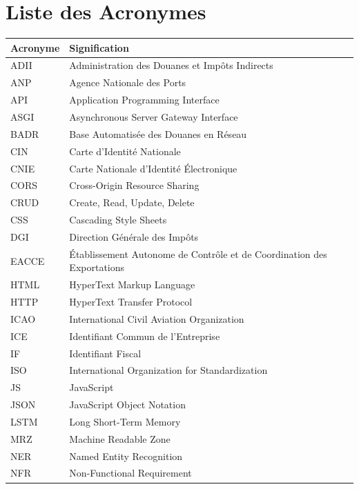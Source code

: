 
\chapter*{Liste des Acronymes}

\renewcommand{\arraystretch}{1.2}

\begin{longtable}{p{3cm} p{11cm}}
\toprule
\textbf{Acronyme} & \textbf{Signification} \\
\midrule
\endhead

ADII   & Administration des Douanes et Imp\^{o}ts Indirects \\
ANP    & Agence Nationale des Ports \\
API    & Application Programming Interface \\
ASGI   & Asynchronous Server Gateway Interface \\
BADR   & Base Automatis\'{e}e des Douanes en R\'{e}seau \\
CIN    & Carte d'Identit\'{e} Nationale \\
CNIE   & Carte Nationale d'Identit\'{e} \'{E}lectronique \\
CORS   & Cross-Origin Resource Sharing \\
CRUD   & Create, Read, Update, Delete \\
CSS    & Cascading Style Sheets \\
DGI    & Direction G\'{e}n\'{e}rale des Imp\^{o}ts \\
EACCE  & \'{E}tablissement Autonome de Contr\^{o}le et de Coordination des Exportations \\
HTML   & HyperText Markup Language \\
HTTP   & HyperText Transfer Protocol \\
ICAO   & International Civil Aviation Organization \\
ICE    & Identifiant Commun de l'Entreprise \\
IF     & Identifiant Fiscal \\
ISO    & International Organization for Standardization \\
JS     & JavaScript \\
JSON   & JavaScript Object Notation \\
LSTM   & Long Short-Term Memory \\
MRZ    & Machine Readable Zone \\
NER    & Named Entity Recognition \\
NFR    & Non-Functional Requirement \\

\end{longtable}
